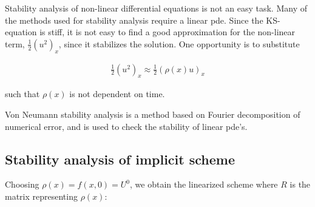 

Stability analysis of non-linear differential equations is not an easy task. Many of the methods used for stability analysis require a linear pde. Since the KS-equation is stiff, it is not easy to find a good approximation for the non-linear term, $\frac{1}{2}(u^2)_x$, since it stabilizes the solution. One opportunity is to substitute 

\begin{align*}
\frac{1}{2}(u^2)_x \approx \frac{1}{2}(\rho(x)u)_x
\end{align*} 

such that $\rho(x)$ is not dependent on time. 

Von Neumann stability analysis is a method based on Fourier decomposition of numerical error, and is used to check the stability of linear pde's. 


\subsection*{Stability analysis of implicit scheme}

 
Choosing $\rho(x) = f(x,0) = U^0$, we obtain the linearized scheme where $R$ is the matrix representing $\rho(x)$:


